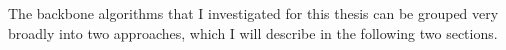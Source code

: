 The backbone algorithms that I investigated for this thesis can be grouped very broadly into two approaches, which I will describe in the following two sections.

